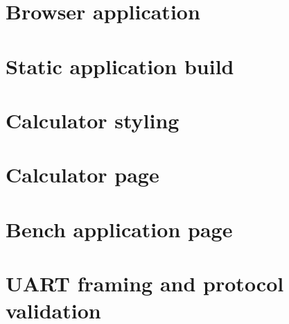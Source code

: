 \section{Browser application}




\section{Static application build}




\section{Calculator styling}




\section{Calculator page}




\section{Bench application page}




\section{UART framing and protocol validation}




